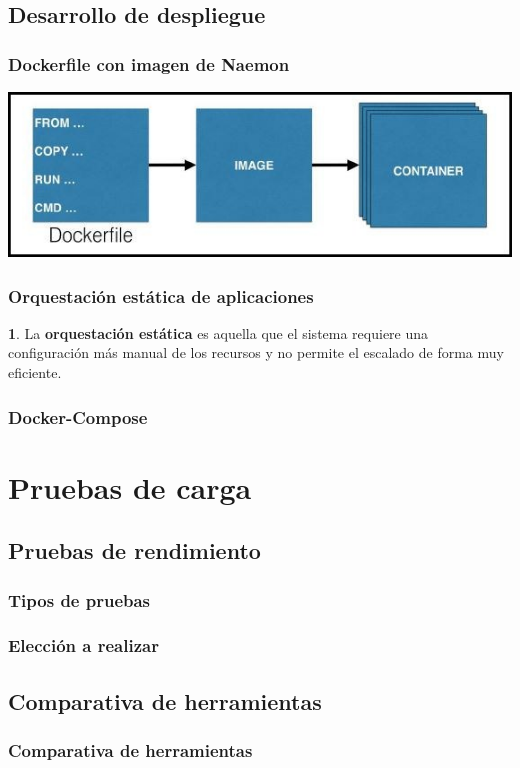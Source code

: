 \documentclass{beamer}
\theoremstyle{plain}
\theoremstyle{definition}
\newtheorem{defn}[thm]{}
\theoremstyle{plain}
\theoremstyle{definition}
\theoremstyle{remark}
\theoremstyle{definition}
\begin{document}
\subsection{Desarrollo de despliegue}
\begin{frame}
	\frametitle{Dockerfile con imagen de Naemon}
	\centering
	\includegraphics[scale=0.4]{imagenes/dockerfile-image.png}
	
\end{frame}
\begin{frame}
	\frametitle{Orquestación estática de aplicaciones}
	\begin{defn}
		La \textbf{orquestación estática} es aquella que el sistema requiere una configuración más
		manual de los recursos y no permite el escalado de forma muy eficiente.
	\end{defn}
\end{frame}
\begin{frame}
	\frametitle{Docker-Compose}
\end{frame}
\section{Pruebas de carga} %


\subsection{Pruebas de rendimiento}
\begin{frame}
	\frametitle{Tipos de pruebas}
	
\end{frame}
\begin{frame}
	\frametitle{Elección a realizar}
	
\end{frame}

\subsection{Comparativa de herramientas}
\begin{frame}
	\frametitle{Comparativa de herramientas}
	
\end{frame}
\end{document}

